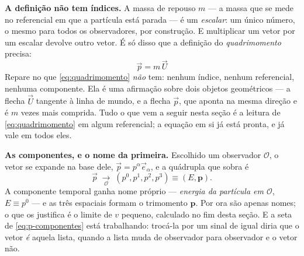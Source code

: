 \documentclass[12pt,a4paper,oneside]{book}
\theoremstyle{rgplain}
\theoremstyle{rgremark}
\newcommand{\obs}{\mathcal{O}}
\newcommand{\temcomp}[1]{\;\underset{#1}{\longrightarrow}\;}
\begin{document}
\textbf{A definição não tem índices.} A massa de repouso $m$ --- a massa que se
mede no referencial em que a partícula está parada --- é um \emph{escalar}: um
único número, o mesmo para todos os observadores, por construção. E multiplicar
um vetor por um escalar devolve outro vetor. É só disso que a definição do
\emph{quadrimomento} precisa:
\begin{equation}
  \boxed{\ \vec p=m\,\vec U\ }
  \label{eq:quadrimomento}
\end{equation}
Repare no que \eqref{eq:quadrimomento} \emph{não} tem: nenhum índice, nenhum
referencial, nenhuma componente. Ela é uma afirmação sobre dois objetos
geométricos --- a flecha $\vec U$ tangente à linha de mundo, e a flecha $\vec p$,
que aponta na mesma direção e é $m$ vezes mais comprida. Tudo o que vem a
seguir nesta seção é a leitura de \eqref{eq:quadrimomento} em algum
referencial; a equação em si já está pronta, e já vale em todos eles.

\textbf{As componentes, e o nome da primeira.} Escolhido um observador $\obs$,
o vetor se expande na base dele, $\vec p=p^\alpha\vec e_\alpha$, e a quádrupla
que sobra é
\begin{equation}
  \vec p\temcomp{\obs}(p^0,p^1,p^2,p^3)\equiv(E,\bm p).
  \label{eq:p-componentes}
\end{equation}
A componente temporal ganha nome próprio --- \emph{energia da partícula em
$\obs$}, $E\equiv p^0$ --- e as três espaciais formam o trimomento $\bm p$. Por
ora são apenas nomes; o que os justifica é o limite de $v$ pequeno, calculado
no fim desta seção. E a seta de \eqref{eq:p-componentes} está trabalhando:
trocá-la por um sinal de igual diria que o vetor \emph{é} aquela lista, quando
a lista muda de observador para observador e o vetor não.
\end{document}
